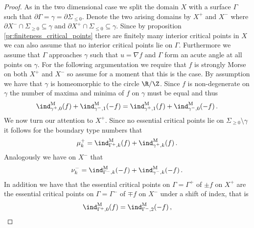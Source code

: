 \begin{proof}
  As in the two dimensional case we split the domain $X$ with a surface $\Gamma$ such that
  $\partial\Gamma=\gamma=\partial\Sigma_{\leq0}$.
  Denote the two arising domains by $X^+$ and $X^-$ where $\partial X^-\cap\Sigma_{\geq0}\subseteq\gamma$ and
  $\partial X^+\cap \Sigma_{\leq0}\subseteq\gamma$.
  Since by proposition \ref{pr:finiteness_critical_points} there are finitely many interior critical points in $X$
  we can also assume that no interior critical points lie on $\Gamma$.
  Furthermore we assume that $\Gamma$ approaches $\gamma$ such that $u=\nabla f$ and $\Gamma$ form an acute angle at all points on $\gamma$.
  For the following argumentation we require that $f$ is strongly Morse on both $X^+$ and
  $X^-$ so assume for a moment that this is the case.
  By assumption we have that $\gamma$ is homeomorphic to the circle $\R/\Z$.
  Since $f$ is non-degenerate on $\gamma$
  the number of maxima and minima of $f$ on $\gamma$ must be equal and thus
  \begin{align}
    \ind^\text{M}_{\gamma^+,0}(f)+\ind^\text{M}_{\gamma^-,1}(-f)=\ind^\text{M}_{\gamma^+,1}(f)+\ind^\text{M}_{\gamma^-,0}(-f)\,.
    \label{eq:n3_disproof_morse_maxMinRel}
  \end{align}
  We now turn our attention to $X^+$. Since no essential critical points lie on $\Sigma_{\geq0}\setminus\gamma$ 
  it follows for the boundary type numbers that
  \begin{align}
    \mu^+_k=\ind^\text{M}_{\Gamma^+, k}(f)+\ind^\text{M}_{\gamma^+,k}(f)\,.\label{eq:n3_disproof_morse_muplus}
  \end{align}
  Analogously we have on $X^-$ that
  \begin{align}
    \nu^-_k=\ind^\text{M}_{\Gamma^-,k}(-f)+\ind^\text{M}_{\gamma^-,k}(-f)\,.\label{eq:n3_disproof_morse_numinus}
  \end{align}
  In addition we have that the essential critical points on $\Gamma=\Gamma^+$ of $\pm f$ on $X^+$ are the
  essential critical points on $\Gamma=\Gamma^-$ of $\mp f$ on $X^-$ under a shift of index, that is
  \begin{equation}
    \begin{aligned}
      \ind^\text{M}_{\Gamma^+,0}(f)&=\ind^\text{M}_{\Gamma^-,2}(-f)\,, \\

\end{aligned}
\end{equation}
\end{proof}
